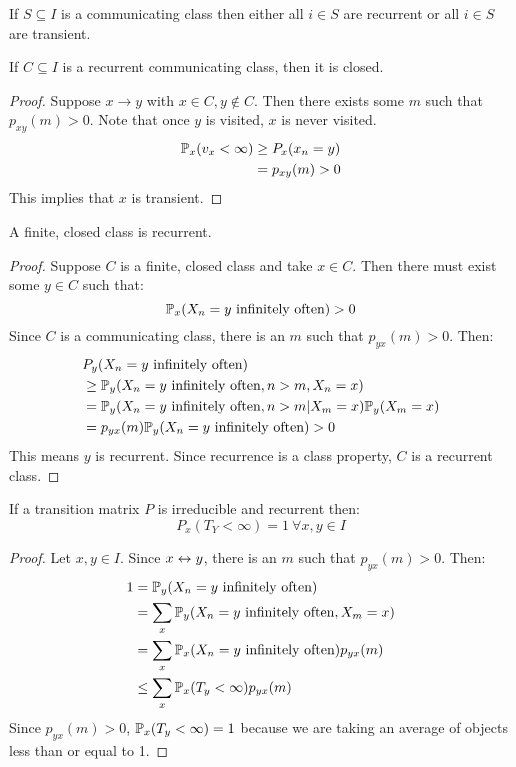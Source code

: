 \documentclass[../Main.tex]{subfiles}
\begin{document}
\begin{corollary}
    If $S \subseteq I$ is a communicating class then either all $i \in S$ are recurrent or all $i \in S$ are transient.
    \label{corComClassRecur}
\end{corollary}
\begin{theorem}
    If $C \subseteq I$ is a recurrent communicating class, then it is closed.
    \label{thmRecurCommClosed}
\end{theorem}
\begin{proof}
    Suppose $x \to y$ with $x \in C, y \notin C$. Then there exists some $m$ such that $p_{xy}(m) > 0$. Note that once $y$ is visited, $x$ is never visited.
    \begin{align*}
        \P_x(v_x < \infty) &\geq P_x(x_n = y) \\
        &= p_{xy}(m) > 0
    \end{align*}
    This implies that $x$ is transient.\contradiction
\end{proof}
\begin{theorem}
    A finite, closed class is recurrent.
    \label{thmFinClosedRecurr}
\end{theorem}
\begin{proof}
    Suppose $C$ is a finite, closed class and take $x \in C$. Then there must exist some $y \in C$ such that:
    \begin{equation*}
        \P_x(X_n = y \io) > 0
    \end{equation*}
    Since $C$ is a communicating class, there is an $m$ such that $p_{yx}(m) > 0$. Then:
    \begin{align*}
        &P_y(X_n = y \io)\\
        &\geq \P_y(X_n = y \io, n > m, X_n = x) \\
        &= \P_y(X_n = y \io, n > m | X_m = x) \P_y(X_m = x) \\
        &= p_{yx}(m) \P_y(X_n = y \io) > 0
    \end{align*}
    This means $y$ is recurrent. Since recurrence is a class property, $C$ is a recurrent class.
\end{proof}
\begin{theorem}
    If a transition matrix $P$ is irreducible and recurrent then:
    \begin{equation*}
        P_x(T_Y < \infty) = 1~\forall x, y \in I
    \end{equation*}
    \label{thmRecurHittingTime}
\end{theorem}
\begin{proof}
    Let $x, y \in I$. Since $x \comms y$, there is an $m$ such that $p_{yx}(m) > 0$. Then:
    \begin{align*}
        1 &= \P_y(X_n = y \io) \\
        &= \sum_x \P_y(X_n = y \io, X_m = x) \\
        &= \sum_x \P_x(X_n = y \io) p_{yx}(m) \\
        &\leq \sum_x \P_x(T_y < \infty)p_{yx}(m)
    \end{align*}
    Since $p_{yx}(m) > 0$, $\P_x(T_y < \infty) = 1$ because we are taking an average of objects less than or equal to 1.
\end{proof}
\end{document}
